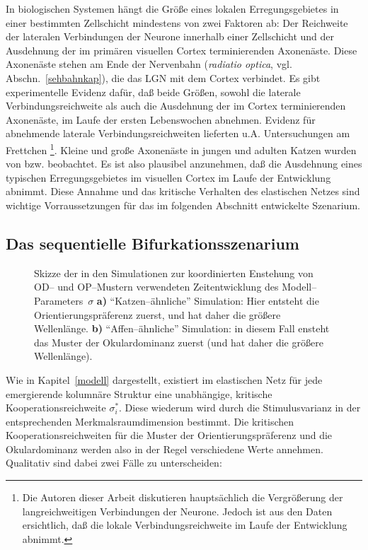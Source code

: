In biologischen Systemen hängt die Größe eines lokalen Erregungsgebietes
in einer bestimmten Zellschicht mindestens von zwei Faktoren ab: Der
Reichweite der lateralen Verbindungen der Neurone innerhalb einer
Zellschicht und der Ausdehnung der im primären visuellen Cortex
terminierenden Axonenäste. Diese Axonenäste stehen am Ende der
Nervenbahn (\emph{radiatio optica}, vgl. Abschn.~\ref{sehbahnkap}), die das
LGN mit dem Cortex verbindet. Es gibt experimentelle Evidenz dafür, daß
beide Größen, sowohl die laterale Verbindungsreichweite als auch die
Ausdehnung der im Cortex terminierenden Axonenäste, im Laufe der ersten
Lebenswochen abnehmen. Evidenz für abnehmende laterale
Verbindungsreichweiten lieferten u.A. Untersuchungen am Frettchen
\cite{katz:1994}\footnote{Die Autoren dieser Arbeit diskutieren hauptsächlich
die Vergrößerung der langreichweitigen Verbindungen der Neurone. Jedoch
ist aus den Daten ersichtlich, daß die lokale Verbindungsreichweite im
Laufe der Entwicklung abnimmt.}. Kleine und große Axonenäste in jungen und
adulten Katzen wurden von \textcite{ferster:1978}
bzw. \textcite{levay:1979} beobachtet. Es ist also plausibel anzunehmen,
daß die Ausdehnung eines typischen Erregungsgebietes im visuellen Cortex
im Laufe der Entwicklung abnimmt. Diese Annahme und das kritische Verhalten
des elastischen Netzes sind wichtige Vorraussetzungen für das im folgenden
Abschnitt entwickelte Szenarium.
\setcounter{footnote}{1}

\subsection{Das sequentielle Bifurkationsszenarium}

\begin{figure}[t]
    \centering
    \caption{Skizze der in den Simulationen zur koordinierten Enstehung von
    OD-- und OP--Mustern verwendeten Zeitentwicklung des
    Modell--Parameters~$\sigma$ \textbf{a)} ``Katzen--ähnliche'' Simulation:
    Hier entsteht die Orientierungspräferenz zuerst, und hat daher die
    größere Wellenlänge. \textbf{b)} ``Affen--ähnliche'' Simulation: in
    diesem Fall ensteht das Muster der Okulardominanz zuerst (und hat daher die
    größere Wellenlänge).}
    \label{zeitentwicklung}
\end{figure}

Wie in Kapitel~\ref{modell} dargestellt, existiert im elastischen Netz für
jede emergierende kolumnäre Struktur eine unabhängige, kritische
Kooperationsreichweite $\sigma_i^\ast$. Diese wiederum wird durch die
Stimulusvarianz in der entsprechenden Merkmalsraumdimension bestimmt. Die
kritischen Kooperationsreichweiten für die Muster der
Orientierungspräferenz und die Okulardominanz werden also in der Regel
verschiedene Werte annehmen. Qualitativ sind dabei zwei Fälle zu
unterscheiden:

